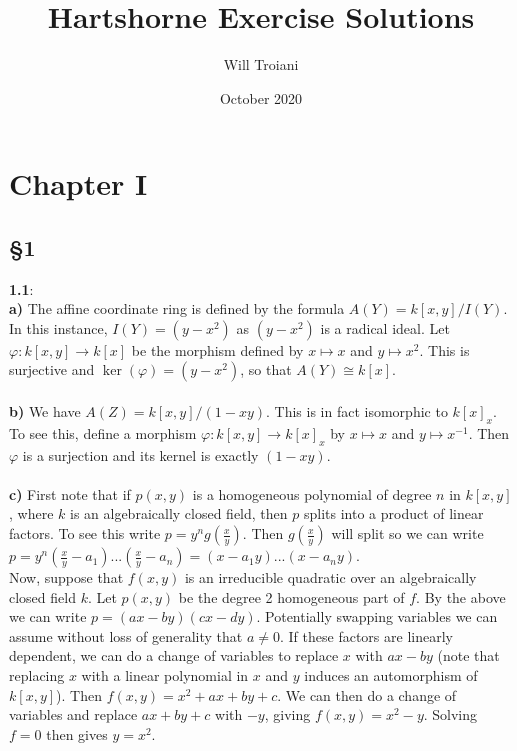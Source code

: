 \documentclass[12pt]{article}
\title{Hartshorne Exercise Solutions}
\author{Will Troiani}
\date{October 2020}
\numberwithin{thm}{subsection}
\numberwithin{defn}{subsection}
\numberwithin{lemma}{subsection}
\numberwithin{example}{subsection}
\numberwithin{notation}{subsection}
\numberwithin{cor}{subsection}
\numberwithin{remark}{subsection}
\numberwithin{condition}{subsection}
\numberwithin{question}{subsection}
\numberwithin{construction}{subsection}
\numberwithin{construction}{subsection}
\numberwithin{construction}{subsection}
\begin{document}
\maketitle
\section{Chapter I}
\tableofcontents
\subsection{\S 1}
\textbf{1.1}:\\
%
\textbf{a)} The affine coordinate ring is defined by the formula $A(Y)=k[x,y]/I(Y)$. In this instance, $I(Y)=(y-x^2)$ as $(y-x^2)$ is a radical ideal. Let $\varphi:k[x,y]\to k[x]$ be the morphism defined by $x\mapsto x$ and $y\mapsto x^2$. This is surjective and $\ker(\varphi)=(y-x^2)$, so that $A(Y)\cong k[x]$.\\\\
%
\textbf{b)} We have $A(Z)=k[x,y]/(1-xy)$. This is in fact isomorphic to $k[x]_x$. To see this, define a morphism $\varphi:k[x,y]\to k[x]_x$ by $x\mapsto x$ and $y\mapsto x^{-1}$. Then $\varphi$ is a surjection and its kernel is exactly $(1-xy)$.\\\\
%
\textbf{c)} First note that if $p(x,y)$ is a homogeneous polynomial of degree $n$ in $k[x,y]$, where $k$ is an algebraically closed field, then $p$ splits into a product of linear factors. To see this write $p=y^ng(\frac{x}{y})$. Then $g(\frac{x}{y})$ will split so we can write $p=y^n(\frac{x}{y}-a_1)...(\frac{x}{y}-a_n)=(x-a_1y)...(x-a_ny)$.\\
        
        Now, suppose that $f(x,y)$ is an irreducible quadratic over an algebraically closed field $k$. Let $p(x,y)$ be the degree 2 homogeneous part of $f$. By the above we can write $p=(ax-by)(cx-dy)$. Potentially swapping variables we can assume without loss of generality that $a\neq 0$. If these factors are linearly dependent, we can do a change of variables to replace $x$ with $ax-by$ (note that replacing $x$ with a linear polynomial in $x$ and $y$ induces an automorphism of $k[x,y]$). Then $f(x,y)=x^2+ax+by+c$. We can then do a change of variables and replace $ax+by+c$ with $-y$, giving $f(x,y)=x^2-y$. Solving $f=0$ then gives $y=x^2$.\\
        
\end{document}
